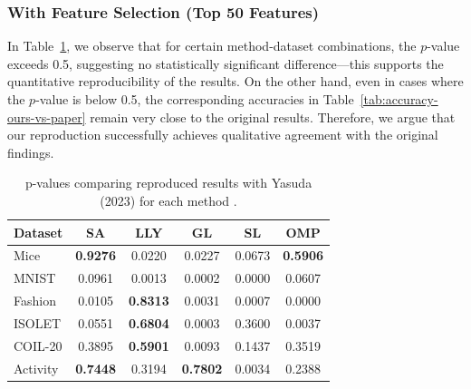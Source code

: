 \documentclass[a4paper,twocolumn]{article} %
\begin{document}
\subsubsection*{With Feature Selection (Top 50 Features)}
In Table~\ref{tab:methodwise-pval}, we observe that for certain method-dataset combinations, the $p$-value exceeds 0.5, suggesting no statistically significant difference—this supports the quantitative reproducibility of the results. On the other hand, even in cases where the $p$-value is below 0.5, the corresponding accuracies in Table~\ref{tab:accuracy-ours-vs-paper} remain very close to the original results. Therefore, we argue that our reproduction successfully achieves qualitative agreement with the original findings.
\begin{table}[ht]
\centering
\scriptsize
\begin{tabular}{lccccc}
\hline
\textbf{Dataset} & \textbf{SA} & \textbf{LLY} & \textbf{GL} & \textbf{SL} & \textbf{OMP} \\
\hline
Mice     & \textbf{0.9276} & 0.0220 & 0.0227 & 0.0673 & \textbf{0.5906} \\
MNIST    & 0.0961 & 0.0013 & 0.0002 & 0.0000 & 0.0607 \\
Fashion  & 0.0105 & \textbf{0.8313} & 0.0031 & 0.0007 & 0.0000 \\
ISOLET   & 0.0551 & \textbf{0.6804} & 0.0003 & 0.3600 & 0.0037 \\
COIL-20  & 0.3895 & \textbf{0.5901} & 0.0093 & 0.1437 & 0.3519 \\
Activity & \textbf{0.7448} & 0.3194 & \textbf{0.7802} & 0.0034 & 0.2388 \\
\hline
\end{tabular}
\caption{p-values comparing reproduced results with Yasuda (2023) for each method .}
\label{tab:methodwise-pval}
\end{table}
\end{document}
